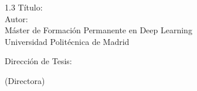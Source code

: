 
\begin{spacing}{1.3}
Título: \thesisTitle \\
Autor: \thesisAuthor\\
Máster de Formación Permanente en Deep Learning\\
Universidad Politécnica de Madrid\end{spacing}
Dirección de Tesis: 
\begin{mydescription}
    \item \supervisorDetails{} (Directora)
\end{mydescription}

\vspace{\fill}
